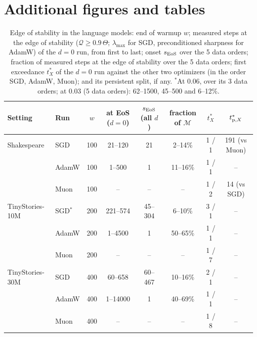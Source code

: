 \documentclass[10pt]{article}
\newcommand{\lmax}{\lambda_{\max}}
\newcommand{\cM}{\mathcal{M}}
\begin{document}
\FloatBarrier
\section{Additional figures and tables}
\label{app:figures}

\begin{table}[ht]
\centering\small
\caption{Edge of stability in the language models: end of warmup $w$; measured steps at the edge of stability
($\mathcal Q\ge0.9\,\Theta$; $\lmax$ for SGD, preconditioned sharpness for AdamW) of the $d=0$ run, from first
to last; onset $s_{\rm EoS}$ over the 5 data orders; fraction of measured steps at the edge of stability over
the 5 data orders; first exceedance $t^\ast_X$ of the $d=0$ run against the other two optimizers (in the order
SGD, AdamW, Muon); and its persistent split, if any. $^\ast$At 0.06, over its 3 data orders; at 0.03 (5 data
orders): 62--1500, 45--500 and 6--12\%.}
\label{tab:coincide}
\setlength{\tabcolsep}{4pt}
\begin{tabular}{@{}llcccccc@{}}
\toprule
Setting & Run & $w$ & at EoS ($d=0$) & $s_{\rm EoS}$ (all $d$) & fraction of $\cM$ & $t^\ast_X$ & $t^\ast_{{\rm p},X}$ \\
\midrule
Shakespeare     & SGD   & 100 & 21--120   & 21     & 2--14\%  & 1 / 1 & 191 (vs Muon) \\
                & AdamW & 100 & 1--500    & 1      & 11--16\% & 1 / 1 & -- \\
                & Muon  & 100 & --        & --     & --       & 1 / 2 & 14 (vs SGD) \\
TinyStories-10M & SGD$^\ast$ & 200 & 221--574 & 45--304 & 6--10\% & 3 / 1 & -- \\
                & AdamW & 200 & 1--4500   & 1      & 50--65\% & 1 / 1 & -- \\
                & Muon  & 200 & --        & --     & --       & 1 / 7 & -- \\
TinyStories-30M & SGD   & 400 & 60--658   & 60--467 & 10--16\% & 2 / 1 & -- \\
                & AdamW & 400 & 1--14000  & 1      & 40--69\% & 1 / 1 & -- \\
                & Muon  & 400 & --        & --     & --       & 1 / 8 & -- \\
\bottomrule
\end{tabular}
\end{table}
\end{document}
